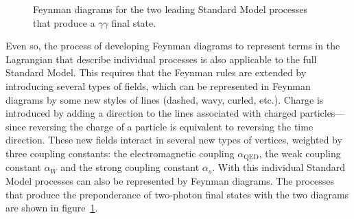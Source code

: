 \begin{figure}[htb]
\parbox[t]{.45\textwidth}{\begin{center}\begin{footnotesize}
\end{footnotesize}\end{center}
}\hfill
\parbox[t]{.52\textwidth}{\begin{center}\begin{footnotesize}
\end{footnotesize}\end{center}
}\hfill
\caption{ Feynman diagrams for the two leading Standard Model processes that produce a $\gamma\gamma$ final state.\label{smfeyn}}
\end{figure}

Even so, the process of developing Feynman diagrams to represent terms in the Lagrangian that describe individual processes is also applicable to the full Standard Model. This requires that the Feynman rules are extended by introducing several types of fields, which can be represented in Feynman diagrams by some new styles of lines (dashed, wavy, curled, etc.). Charge is introduced by adding a direction to the lines associated with charged particles---since reversing the charge of a particle is equivalent to reversing the time direction. These new fields interact in several new types of vertices, weighted by three coupling constants: the electromagnetic coupling $\alpha_\text{QED}$, the weak coupling constant $\alpha_W$ and the strong coupling constant $\alpha_s$. With this individual Standard Model processes can also be represented by Feynman diagrams. The processes that produce the preponderance of two-photon final states with the two diagrams are shown in figure~\ref{smfeyn}.

